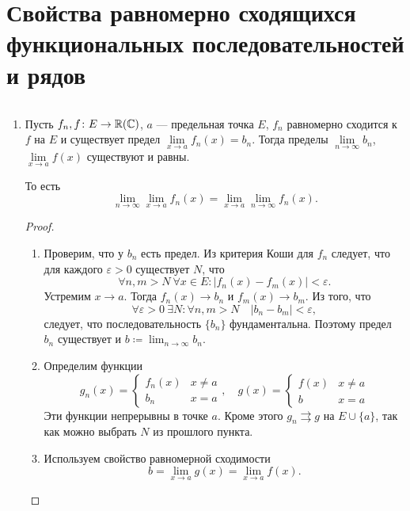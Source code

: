 \section{Свойства равномерно сходящихся функциональных последовательностей и рядов}
\begin{prop}
$ $
	\begin{enumerate}
		\item Пусть $ f_n, f\colon E \to \mathbb{R}(\mathbb{C})$, $ a$ --- предельная точка  $ E$,  $ f_n$ равномерно сходится к  $ f$ на $ E$ и существует предел $ \lim\limits_{x \to  a}f_n(x) = b_n$.
			Тогда пределы $ \lim\limits_{n \to  \infty} b_n$, $ \lim\limits_{x \to a} f(x)$ существуют и равны.

			То есть \[
				\lim_{n \to \infty} \lim_{x \to  a} f_n(x) = \lim_{x \to  a} \lim_{n \to \infty} f_n(x)
			.\]
			\begin{proof}
				$ $
				\begin{enumerate}
					\item Проверим, что у $ b_n$ есть предел. Из критерия Коши для $ f_n$ следует, что для каждого  $ \varepsilon >0$ существует $ N$, что
						\[
							\forall n, m > N ~ \forall x \in E \colon \lvert f_n(x) - f_m(x) \rvert < \varepsilon
						.\]
						Устремим $ x \to  a$. Тогда $ f_n(x) \to b_n$ и $ f_m(x) \to b_m$. Из того, что
						\[
							\forall \varepsilon  > 0 ~ \exists N\colon \forall n, m > N \quad \lvert b_n - b_m \rvert < \varepsilon
						,\]
						следует, что  последовательность $ \{b_n\}$ фундаментальна. Поэтому предел  $ b_n$ существует и  $ b\coloneqq \lim_{n \to \infty} b_n $.
					\item Определим функции
						\[
							g_n(x) =
							\begin{cases}
								f_n(x) & x \ne a \\
								b_n & x = a
							\end{cases}
							,
							\quad
							g(x) =
							\begin{cases}
								f(x) & x \ne a \\
								b & x = a
							\end{cases}
						\]
						Эти функции непрерывны в точке $ a$. Кроме этого  $ g_n \rightrightarrows g$ на $ E \cup \{a\}$, так как можно выбрать $ N$ из прошлого пункта.
					\item Используем свойство равномерной сходимости %
						\[
							b = \lim_{x \to  a} g(x) = \lim_{x \to a} f(x)
						.\]
				\end{enumerate}
			\end{proof}
	\end{enumerate}
\end{prop}
% 
